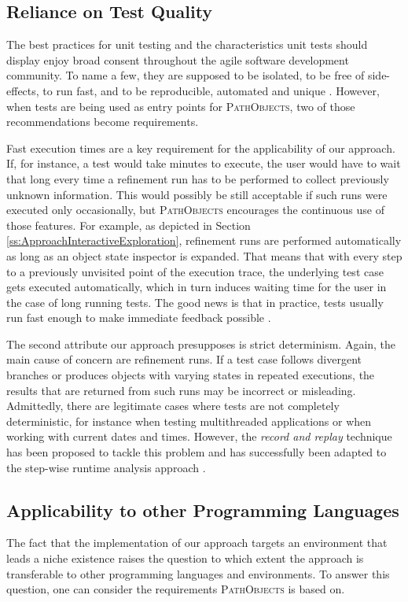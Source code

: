 \subsection{Reliance on Test Quality}
\label{ss:DiscussionLimitationsTestQuality}
The best practices for unit testing and the characteristics unit tests should display enjoy broad consent throughout the agile software development community.
To name a few, they are supposed to be isolated, to be free of side-effects, to run fast, and to be reproducible, automated and unique \cite{meszaros_xunit_2006, beck_test_2002}.
However, when tests are being used as entry points for \textsc{PathObjects}, two of those recommendations become requirements.

Fast execution times are a key requirement for the applicability of our approach.
If, for instance, a test would take minutes to execute, the user would have to wait that long every time a refinement run has to be performed to collect previously unknown information.
This would possibly be still acceptable if such runs were executed only occasionally, but \textsc{PathObjects} encourages the continuous use of those features.
For example, as depicted in Section \ref{ss:ApproachInteractiveExploration}, refinement runs are performed automatically as long as an object state inspector is expanded.
That means that with every step to a previously unvisited point of the execution trace, the underlying test case gets executed automatically, which in turn induces waiting time for the user in the case of long running tests. The good news is that in practice, tests usually run fast enough to make immediate feedback possible \cite{perscheid_immediacy_2010}.

The second attribute our approach presupposes is strict determinism.
Again, the main cause of concern are refinement runs.
If a test case follows divergent branches or produces objects with varying states in repeated executions, the results that are returned from such runs may be incorrect or misleading.
Admittedly, there are legitimate cases where tests are not completely deterministic, for instance when testing multithreaded applications or when working with current dates and times.
However, the \emph{record and replay} technique has been proposed to tackle this problem \cite{choi_deterministic_1998} and has successfully been adapted to the step-wise runtime analysis approach \cite{felgentreff_comparison_2012}.

\subsection{Applicability to other Programming Languages}
\label{ss:DiscussionApplicability}
The fact that the implementation of our approach targets an environment that leads a niche existence raises the question to which extent the approach is transferable to other programming languages and environments.
To answer this question, one can consider the requirements \textsc{PathObjects} is based on.

